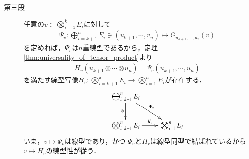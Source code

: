 \begin{prf}
\begin{description}
			\item[第三段]
				任意の$v \in \bigotimes_{i=1}^k E_i$に対して
				\begin{align}
					\Psi_v: \bigoplus_{i=k+1}^n E_i
					\ni (u_{k+1},\cdots,u_n)
					\longmapsto G_{u_{k+1},\cdots,u_n}(v)
				\end{align}
				を定めれば，$\Psi_v$は$n$重線型であるから，定理\ref{thm:universality_of_tensor_product}より
				\begin{align}
					H_v(u_{k+1} \otimes \cdots \otimes u_n)
					= \Psi_v(u_{k+1},\cdots,u_n)
				\end{align}
				を満たす線型写像$H_v:\bigotimes_{i=k+1}^n E_i \longrightarrow 
				\bigotimes_{i=1}^n E_i$が存在する．
				\begin{align}
					\xymatrix{
						&\bigoplus_{i=k+1}^n E_i \ar[d]_-\otimes \ar[rd]^-{\Psi_v} & \\
						&\bigotimes_{i=k+1}^n E_i \ar[r]^-{H_v} & \bigotimes_{i=1}^n E_i
					}
				\end{align}
				いま，$v \longmapsto \Psi_v$は線型であり，かつ
				$\Psi_v$と$H_v$は線型同型で結ばれているから
				$v \longmapsto H_v$の線型性が従う．
				

\end{description}
\end{prf}
